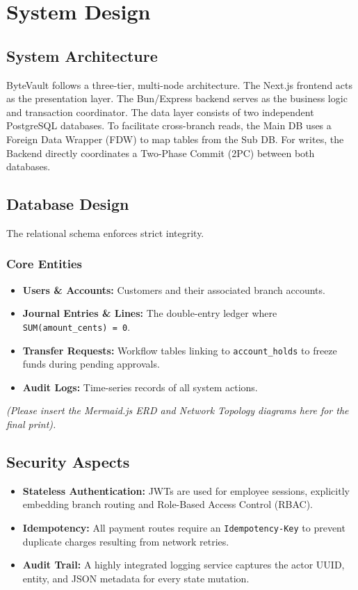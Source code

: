\chapter{System Design}

\section{System Architecture}
ByteVault follows a three-tier, multi-node architecture. The Next.js frontend acts as the presentation layer. The Bun/Express backend serves as the business logic and transaction coordinator. The data layer consists of two independent PostgreSQL databases. To facilitate cross-branch reads, the Main DB uses a Foreign Data Wrapper (FDW) to map tables from the Sub DB. For writes, the Backend directly coordinates a Two-Phase Commit (2PC) between both databases.

\section{Database Design}
The relational schema enforces strict integrity. 
\subsection{Core Entities}
\begin{itemize}
    \item \textbf{Users \& Accounts:} Customers and their associated branch accounts.
    \item \textbf{Journal Entries \& Lines:} The double-entry ledger where \texttt{SUM(amount\_cents) = 0}.
    \item \textbf{Transfer Requests:} Workflow tables linking to \texttt{account\_holds} to freeze funds during pending approvals.
    \item \textbf{Audit Logs:} Time-series records of all system actions.
\end{itemize}

\textit{(Please insert the Mermaid.js ERD and Network Topology diagrams here for the final print).}

\section{Security Aspects}
\begin{itemize}
    \item \textbf{Stateless Authentication:} JWTs are used for employee sessions, explicitly embedding branch routing and Role-Based Access Control (RBAC).
    \item \textbf{Idempotency:} All payment routes require an \texttt{Idempotency-Key} to prevent duplicate charges resulting from network retries.
    \item \textbf{Audit Trail:} A highly integrated logging service captures the actor UUID, entity, and JSON metadata for every state mutation.
\end{itemize}

